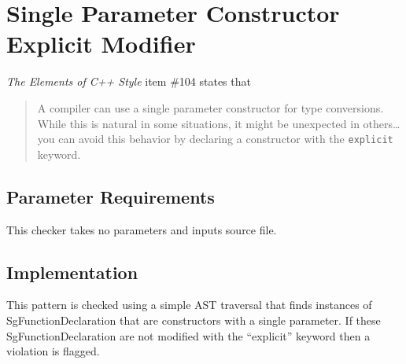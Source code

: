 %
%

\section{Single Parameter Constructor Explicit Modifier}
\label{SingleParameterConstructorExplicitModifier::overview}

{\it The Elements of C++ Style} item \#104 states that
\begin{quote}
A compiler can use a single parameter constructor for type conversions. While this is natural in some situations, it might be unexpected in others\ldots you can avoid this behavior by declaring a constructor with the {\tt explicit} keyword.
\end{quote}

\subsection{Parameter Requirements}
This checker takes no parameters and inputs source file.

\subsection{Implementation}
This pattern is checked using a simple AST traversal that finds instances of
SgFunctionDeclaration that are constructors with a single parameter. If these
SgFunctionDeclaration are not modified with the ``explicit'' keyword then
a violation is flagged.

